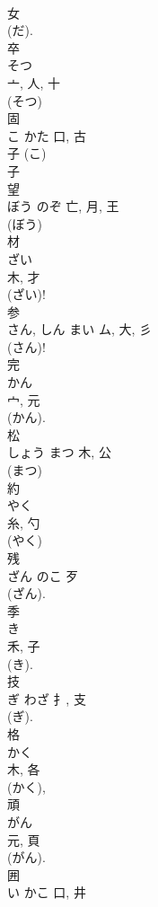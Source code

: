 \documentclass[8pt]{extreport}
\begin{document}
\begin{CJK}{UTF8}{min}
\\	女		
\\	(だ). 
\\	卒	
\\	そつ	
\\	亠, 人, 十	
\\	(そつ) 
\\	固	
\\	こ	かた	口, 古	
\\	子 (こ) 
\\	子 
\\	望	
\\	ぼう	のぞ	亡, 月, 王	
\\	(ぼう) 
\\	材	
\\	ざい	
\\	木, 才	
\\	(ざい)! 
\\	参	
\\	さん, しん	まい	ム, 大, 彡	
\\	(さん)! 
\\	完	
\\	かん	
\\	宀, 元	
\\	(かん). 
\\	松	
\\	しょう	まつ	木, 公	
\\	(まつ) 
\\	約	
\\	やく	
\\	糸, 勺	
\\	(やく) 
\\	残	
\\	ざん	のこ	歹		
\\	(ざん).	
\\	季	
\\	き	
\\	禾, 子	
\\	(き). 
\\	技	
\\	ぎ	わざ	扌, 支	
\\	(ぎ). 
\\	格	
\\	かく	
\\	木, 各	
\\	(かく), 
\\	頑	
\\	がん	
\\	元, 頁	
\\	(がん). 
\\	囲	
\\	い	かこ	口, 井	

\end{CJK}
\end{document}
